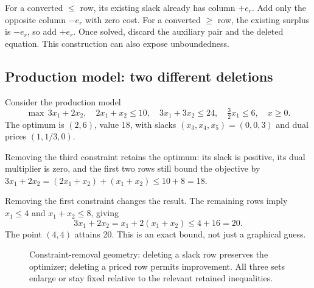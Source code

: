 \documentclass[11pt,a4paper]{article}
\begin{document}
For a converted $\leq$ row, its existing slack already has column $+e_r$.
Add only the opposite column $-e_r$ with zero cost.
For a converted $\geq$ row, the existing surplus is $-e_r$, so add $+e_r$.
Once solved, discard the auxiliary pair and the deleted equation.
This construction can also expose unboundedness.

\subsection{Production model: two different deletions}
Consider the production model
\begin{equation}\label{eq:production}
  \max\,3x_1+2x_2,\quad
  2x_1+x_2\leq10,\quad 3x_1+3x_2\leq24,\quad
  \tfrac32x_1\leq6,\quad x\geq0.
\end{equation}
The optimum is $(2,6)$, value 18, with slacks $(x_3,x_4,x_5)=(0,0,3)$
and dual prices $(1,1/3,0)$.

Removing the third constraint retains the optimum: its slack is positive,
its dual multiplier is zero, and the first two rows still bound the objective
by $3x_1+2x_2=(2x_1+x_2)+(x_1+x_2)\leq10+8=18$.

Removing the first constraint changes the result. The remaining rows imply
$x_1\leq4$ and $x_1+x_2\leq8$, giving
\[
  3x_1+2x_2=x_1+2(x_1+x_2)\leq4+16=20.
\]
The point $(4,4)$ attains 20. This is an exact bound, not just a graphical guess.

\begin{figure}[H]\centering
  \caption{Constraint-removal geometry: deleting a slack row preserves the
    optimizer; deleting a priced row permits improvement. All three sets enlarge
    or stay fixed relative to the relevant retained inequalities.}
\end{figure}
\end{document}
